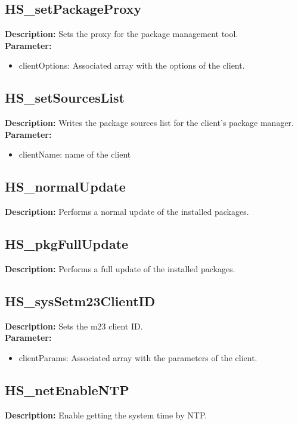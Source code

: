 \subsection{HS\_setPackageProxy}
\textbf{Description:} Sets the proxy for the package management tool.\\
\textbf{Parameter:}
\begin{itemize}
\item clientOptions: Associated array with the options of the client.
\end{itemize}

\subsection{HS\_setSourcesList}
\textbf{Description:} Writes the package sources list for the client's package manager.\\
\textbf{Parameter:}
\begin{itemize}
\item clientName: name of the client
\end{itemize}

\subsection{HS\_normalUpdate}
\textbf{Description:} Performs a normal update of the installed packages.\\

\subsection{HS\_pkgFullUpdate}
\textbf{Description:} Performs a full update of the installed packages.\\

\subsection{HS\_sysSetm23ClientID}
\textbf{Description:} Sets the m23 client ID.\\
\textbf{Parameter:}
\begin{itemize}
\item clientParams: Associated array with the parameters of the client.
\end{itemize}

\subsection{HS\_netEnableNTP}
\textbf{Description:} Enable getting the system time by NTP.\\

